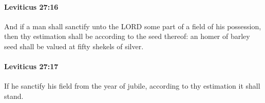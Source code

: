 		\paragraph{Leviticus 27:16} %
			\label{LEVITICUS-27-16}

			And if a man shall sanctify unto the LORD some part of a field of his possession, then thy estimation shall be according to the seed thereof: an homer of barley seed shall be valued at fifty shekels of silver.


		\paragraph{Leviticus 27:17} %
			\label{LEVITICUS-27-17}

			If he sanctify his field from the year of jubile, according to thy estimation it shall stand.


